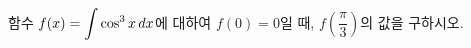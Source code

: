 함수 $f(x)=\displaystyle\int\cos^3 x\mkern3mu dx$에 대하여 $f(0)=0$일 때, $f\!\left(\dfrac{\pi}{3}\right)$의 값을 구하시오.
